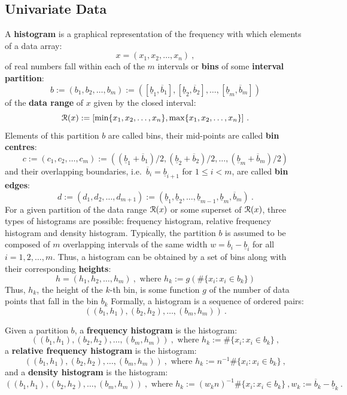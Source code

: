 \subsection{Univariate Data}
A {\bf histogram} is a graphical representation of the frequency with which elements of a data array:
$$x = (x_1,x_2,\ldots,x_n) \ ,$$
of real numbers fall within each of the $m$ intervals or {\bf bins} of some {\bf interval partition}:
$$b := ( b_1, b_2, \ldots, b_m ) := ( [\underline{b}_1,\overline{b}_1], [\underline{b}_2,\overline{b}_2], \ldots, [\underline{b}_m,\overline{b}_m] )$$
of the {\bf data range} of $x$ given by the closed interval:
$$\C{R}(x) := [\min \{x_1,x_2,\ldots,x_n \}, \max \{x_1,x_2,\ldots,x_n \}] \ .$$
Elements of this partition $b$ are called bins, their mid-points are called {\bf bin centres}:
$$c := ( c_1, c_2, \ldots, c_m ) := ( (\underline{b}_1+\overline{b}_1)/2, (\underline{b}_2 + \overline{b}_2)/2, \ldots, (\underline{b}_m + \overline{b}_m)/2 )$$
and their overlapping boundaries, i.e.~$\overline{b}_i=\underline{b}_{i+1}$ for $1 \leq i < m$, are called {\bf bin edges}:
$$d := (d_1,d_2,\ldots,d_{m+1}) := (\underline{b}_1, \underline{b}_2, \ldots, \underline{b}_{m-1}, \underline{b}_m, \overline{b}_m) \ .$$
For a given partition of the data range $\mathcal{R}(x)$ or some superset of $\mathcal{R}(x)$, three types of histograms are possible: frequency histogram, relative frequency histogram and density histogram.  Typically, the partition $b$ is assumed to be composed of $m$ overlapping intervals of the same width $w=\overline{b}_i - \underline{b}_i$ for all $i=1,2,\ldots,m$.  Thus, a histogram can be obtained by a set of bins along with their corresponding {\bf heights}:
$$h = (h_1,h_2,\ldots,h_m) \ , \text{ where } h_k := g(\# \{x_i : x_i \in b_k\} )$$
Thus, $h_k$, the height of the $k$-th bin, is some function $g$ of the number of data points that fall in the bin $b_k$ Formally, a histogram is a sequence of ordered pairs:
$$\left(  (b_1,h_1), (b_2,h_2), \ldots, (b_m,h_m) \right) \ .$$

Given a partition $b$, a {\bf frequency histogram} is the histogram:
$$\left(  (b_1,h_1), (b_2,h_2), \ldots, (b_m,h_m) \right) \ , \text{ where } h_k := \# \{x_i : x_i \in b_k\} \ ,$$
a {\bf relative frequency histogram} is the histogram:
$$\left(  (b_1,h_1), (b_2,h_2), \ldots, (b_m,h_m) \right) \ , \text{ where } h_k := n^{-1} \# \{x_i : x_i \in b_k\} \ ,$$
and a {\bf density histogram} is the histogram:
$$\left(  (b_1,h_1), (b_2,h_2), \ldots, (b_m,h_m) \right) \ , \text{ where } h_k := (w_k n)^{-1} \# \{x_i : x_i \in b_k\} \ , w_k := \overline{b}_k - \underline{b}_k \ .$$

